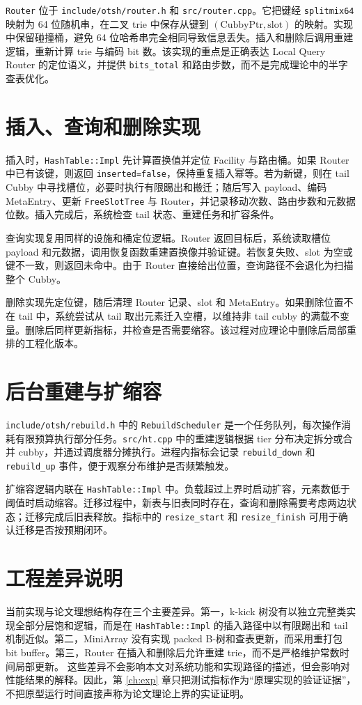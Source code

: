 \texttt{Router} 位于 \texttt{include/otsh/router.h} 和 \texttt{src/router.cpp}。它把键经 \texttt{splitmix64} 映射为 64 位随机串，在二叉 trie 中保存从键到 \((\mathrm{CubbyPtr},\mathrm{slot})\) 的映射。实现中保留碰撞桶，避免 64 位哈希串完全相同导致信息丢失。插入和删除后调用重建逻辑，重新计算 trie 与编码 bit 数。该实现的重点是正确表达 Local Query Router 的定位语义，并提供 \texttt{bits\_total} 和路由步数，而不是完成理论中的半字查表优化。

\section{插入、查询和删除实现}
插入时，\texttt{HashTable::Impl} 先计算置换值并定位 Facility 与路由桶。如果 Router 中已有该键，则返回 \texttt{inserted=false}，保持重复插入幂等。若为新键，则在 tail Cubby 中寻找槽位，必要时执行有限踢出和搬迁；随后写入 payload、编码 MetaEntry、更新 \texttt{FreeSlotTree} 与 Router，并记录移动次数、路由步数和元数据位数。插入完成后，系统检查 tail 状态、重建任务和扩容条件。

查询实现复用同样的设施和桶定位逻辑。Router 返回目标后，系统读取槽位 payload 和元数据，调用恢复函数重建置换像并验证键。若恢复失败、slot 为空或键不一致，则返回未命中。由于 Router 直接给出位置，查询路径不会退化为扫描整个 Cubby。

删除实现先定位键，随后清理 Router 记录、slot 和 MetaEntry。如果删除位置不在 tail 中，系统尝试从 tail 取出元素迁入空槽，以维持非 tail cubby 的满载不变量。删除后同样更新指标，并检查是否需要缩容。该过程对应理论中删除后局部重排的工程化版本。

\section{后台重建与扩缩容}
\texttt{include/otsh/rebuild.h} 中的 \texttt{RebuildScheduler} 是一个任务队列，每次操作消耗有限预算执行部分任务。\texttt{src/ht.cpp} 中的重建逻辑根据 tier 分布决定拆分或合并 cubby，并通过调度器分摊执行。进程内指标会记录 \texttt{rebuild\_down} 和 \texttt{rebuild\_up} 事件，便于观察分布维护是否频繁触发。

扩缩容逻辑内联在 \texttt{HashTable::Impl} 中。负载超过上界时启动扩容，元素数低于阈值时启动缩容。迁移过程中，新表与旧表同时存在，查询和删除需要考虑两边状态；迁移完成后旧表释放。指标中的 \texttt{resize\_start} 和 \texttt{resize\_finish} 可用于确认迁移是否按预期闭环。

\section{工程差异说明}
当前实现与论文理想结构存在三个主要差异。第一，k-kick 树没有以独立完整类实现全部分层饱和逻辑，而是在 \texttt{HashTable::Impl} 的插入路径中以有限踢出和 tail 机制近似。第二，MiniArray 没有实现 packed B-树和查表更新，而采用重打包 bit buffer。第三，Router 在插入和删除后允许重建 trie，而不是严格维护常数时间局部更新。
这些差异不会影响本文对系统功能和实现路径的描述，但会影响对性能结果的解释。因此，第 \ref{ch:exp} 章只把测试指标作为“原理实现的验证证据”，不把原型运行时间直接声称为论文理论上界的实证证明。
